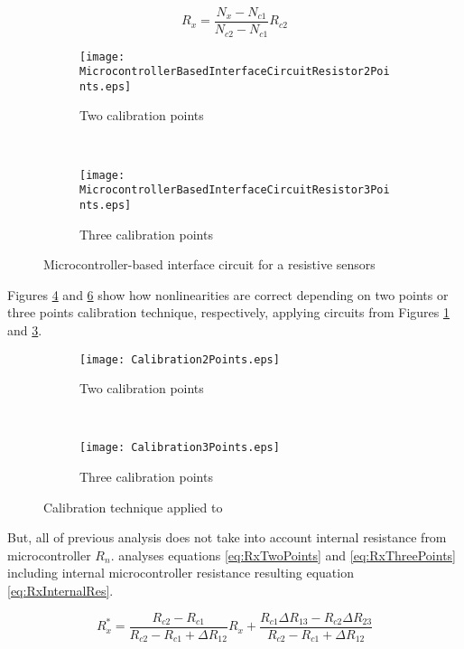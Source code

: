 \begin{equation}
\label{eq:RxThreePoints}
R_{x} = \frac{N_{x}-N_{c1}}{N_{c2}-N_{c1}}R_{c2}
\end{equation}

\begin{figure}[h]
\centering
	\begin{subfigure}{0.45\textwidth}
	\texttt{[image: MicrocontrollerBasedInterfaceCircuitResistor2Points.eps]}
	\caption{Two calibration points}
	\label{fig:MicrocontrollerBasedInterfaceCircuitResistor2Points}
	\end{subfigure}
	~
	\begin{subfigure}{0.45\textwidth}
	\texttt{[image: MicrocontrollerBasedInterfaceCircuitResistor3Points.eps]}
	\caption{Three calibration points}
	\label{fig:MicrocontrollerBasedInterfaceCircuitResistor3Points}
	\end{subfigure}
\caption{Microcontroller-based interface circuit for a resistive sensors}
\end{figure}

Figures \ref{fig:Calibration2Points} and \ref{fig:Calibration3Points} show how nonlinearities are correct depending on two points or three points calibration technique, respectively, applying circuits from Figures \ref{fig:MicrocontrollerBasedInterfaceCircuitResistor2Points} and \ref{fig:MicrocontrollerBasedInterfaceCircuitResistor3Points}.
\medskip

\begin{figure}[!ht]
\centering
	\begin{subfigure}{0.45\textwidth}
	\texttt{[image: Calibration2Points.eps]}
	\caption{Two calibration points}
	\label{fig:Calibration2Points}
	\end{subfigure}
	~
	\begin{subfigure}{0.45\textwidth}
	\texttt{[image: Calibration3Points.eps]}
	\caption{Three calibration points}
	\label{fig:Calibration3Points}
	\end{subfigure}
\caption{Calibration technique applied to}
\end{figure}

But, all of previous analysis does not take into account internal resistance from microcontroller $R_{n}$. \cite{AccuracyAndResolution} analyses equations \eqref{eq:RxTwoPoints} and \eqref{eq:RxThreePoints} including internal microcontroller resistance resulting equation \eqref{eq:RxInternalRes}.

\begin{equation}
\label{eq:RxInternalRes}
R_{x}^{*} = \frac{R_{c2}-R_{c1}}{R_{c2}-R_{c1}+\Delta R_{12}}R_{x}+\frac{R_{c1}\Delta R_{13}-R_{c2}\Delta R_{23}}{R_{c2}-R_{c1}+\Delta R_{12}}
\end{equation}

